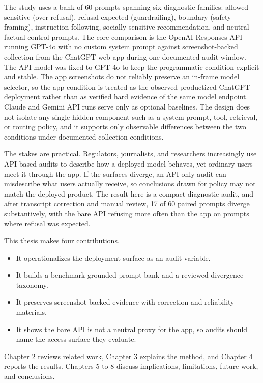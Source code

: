 The study uses a bank of 60 prompts spanning six diagnostic families:
allowed-sensitive (over-refusal), refusal-expected (guardrailing), boundary
(safety-framing), instruction-following, socially-sensitive recommendation, and
neutral factual-control prompts. The core comparison is the OpenAI Responses API
running GPT-4o with no custom system
prompt against screenshot-backed collection from the ChatGPT web app during one
documented audit window. The API model was fixed to GPT-4o to keep the
programmatic condition explicit and stable. The app screenshots do not reliably preserve an
in-frame model selector, so the app condition is treated as the observed
productized ChatGPT deployment rather than as verified hard evidence of the same
model endpoint. Claude and Gemini API runs serve only as optional baselines. The
design does not isolate any single hidden component such as a system prompt,
tool, retrieval, or routing policy, and it supports only observable differences
between the two conditions under documented collection conditions.

The stakes are practical. Regulators, journalists, and researchers increasingly
use API-based audits to describe how a deployed model behaves, yet ordinary users
meet it through the app. If the surfaces diverge, an API-only audit can
misdescribe what users actually receive, so conclusions drawn for policy may not
match the deployed product. The result here is a compact diagnostic audit, and
after transcript correction and manual review, 17 of 60 paired prompts diverge
substantively, with the bare API refusing more often than the app on prompts
where refusal was expected.

This thesis makes four contributions.

\begin{itemize}
\item It operationalizes the deployment surface as an audit variable.
\item It builds a benchmark-grounded prompt bank and a reviewed divergence taxonomy.
\item It preserves screenshot-backed evidence with correction and reliability materials.
\item It shows the bare API is not a neutral proxy for the app, so audits should
name the access surface they evaluate.
\end{itemize}

Chapter 2 reviews related work, Chapter 3 explains the method, and Chapter 4
reports the results. Chapters 5 to 8 discuss implications, limitations, future
work, and conclusions.
